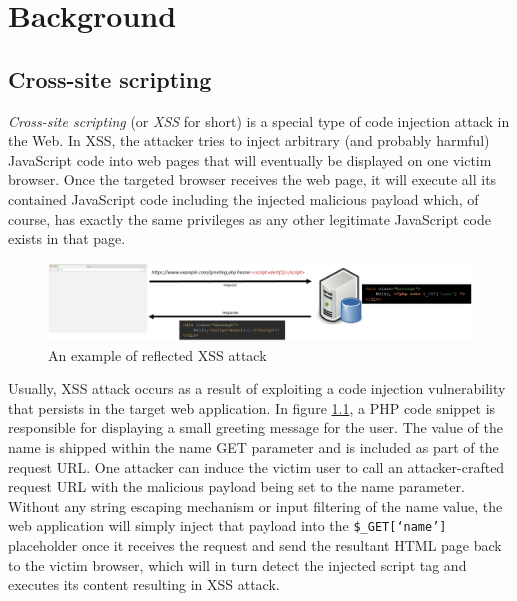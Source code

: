 \chapter{Background}
\section{Cross-site scripting}
\textit{Cross-site scripting} (or \textit{XSS} for short) is a special type of code injection attack in the Web. In XSS, the attacker tries to inject arbitrary (and probably harmful) JavaScript code into web pages that will eventually be displayed on one victim browser\footnotemark . Once the targeted browser receives the web page, it will execute all its contained JavaScript code including the injected malicious payload which, of course, has exactly the same privileges as any other legitimate JavaScript code exists in that page.

\begin{figure}
	\includegraphics[width=\linewidth]{figures/xss_example.jpg}
	\caption{An example of reflected XSS attack}
	\label{fig:xss_example}
\end{figure}

Usually, XSS attack occurs as a result of exploiting a code injection vulnerability that persists in the target web application. In figure \ref{fig:xss_example}, a PHP code snippet is responsible for displaying a small greeting message for the user. The value of the name is shipped within the name GET parameter and is included as part of the request URL. One attacker can induce the victim user to call an attacker-crafted request URL with the malicious payload being set to the name parameter. Without any string escaping mechanism or input filtering of the name value, the web application will simply inject that payload into the \verb!$_GET[‘name’]! placeholder once it receives the request and send the resultant HTML page back to the victim browser, which will in turn detect the injected script tag and executes its content resulting in XSS attack.


